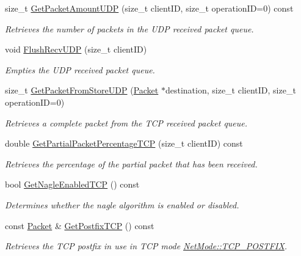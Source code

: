 \begin{DoxyCompactItemize}
size\_\-t \hyperlink{class_net_instance_server_add6aa270fbd6d83ad17183053f11dc2d}{GetPacketAmountUDP} (size\_\-t clientID, size\_\-t operationID=0) const 
\begin{DoxyCompactList}\small\item\em Retrieves the number of packets in the UDP received packet queue. \item\end{DoxyCompactList}\item 
void \hyperlink{class_net_instance_server_a8cfa932ed98a1c99fceb358c3e776d52}{FlushRecvUDP} (size\_\-t clientID)
\begin{DoxyCompactList}\small\item\em Empties the UDP received packet queue. \item\end{DoxyCompactList}\item 
size\_\-t \hyperlink{class_net_instance_server_a39e375bce512ed9f8730bf7df0157752}{GetPacketFromStoreUDP} (\hyperlink{class_packet}{Packet} $\ast$destination, size\_\-t clientID, size\_\-t operationID=0)
\begin{DoxyCompactList}\small\item\em Retrieves a complete packet from the TCP received packet queue. \item\end{DoxyCompactList}\item 
double \hyperlink{class_net_instance_server_ab2a3180190619f8125fe678845da7431}{GetPartialPacketPercentageTCP} (size\_\-t clientID) const 
\begin{DoxyCompactList}\small\item\em Retrieves the percentage of the partial packet that has been received. \item\end{DoxyCompactList}\item 
bool \hyperlink{class_net_instance_server_a417e35aab0663c39d49f777271d5e219}{GetNagleEnabledTCP} () const 
\begin{DoxyCompactList}\small\item\em Determines whether the nagle algorithm is enabled or disabled. \item\end{DoxyCompactList}\item 
const \hyperlink{class_packet}{Packet} \& \hyperlink{class_net_instance_server_aaacfcc13696bf11dd8e4fc11d4eb15b5}{GetPostfixTCP} () const 
\begin{DoxyCompactList}\small\item\em Retrieves the TCP postfix in use in TCP mode \hyperlink{class_net_mode_a43cfa55ee6a4db66a8d7d6c27f766964abe08876125a416186e74c901f6d29ce4}{NetMode::TCP\_\-POSTFIX}. \item\end{DoxyCompactList}\item 

\end{DoxyCompactItemize}
